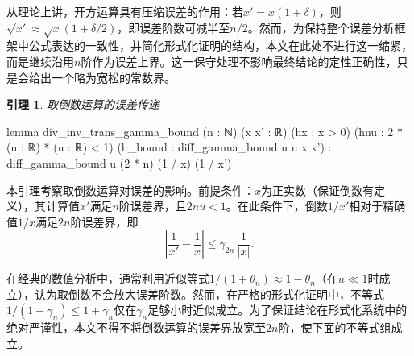 ﻿\documentclass[UTF8,a4paper,openany]{ctexbook}
\theoremstyle{qrplain}
\newtheorem{lemma}[definition]{引理}
{}
\begin{document}
从理论上讲，开方运算具有压缩误差的作用：若$x'=x(1+\delta)$，则$\sqrt{x'} \approx \sqrt{x}(1+\delta/2)$，即误差阶数可减半至$n/2$。然而，为保持整个误差分析框架中公式表达的一致性，并简化形式化证明的结构，本文在此处不进行这一缩紧，而是继续沿用$n$阶作为误差上界。这一保守处理不影响最终结论的定性正确性，只是会给出一个略为宽松的常数界。

\begin{lemma}
\label{lem:inv-bound}
  取倒数运算的误差传递
\end{lemma}
\begin{leancode}
  lemma div_inv_trans_gamma_bound (n : ℕ) (x x' : ℝ) (hx : x > 0)
    (hnu : 2 * (n : ℝ) * (u : ℝ) < 1)
    (h_bound : diff_gamma_bound u n x x') :
      diff_gamma_bound u (2 * n) (1 / x) (1 / x') 
\end{leancode}

本引理考察取倒数运算对误差的影响。前提条件：$x$为正实数（保证倒数有定义），其计算值$x'$满足$n$阶误差界，且$2nu<1$。在此条件下，倒数$1/x'$相对于精确值$1/x$满足$2n$阶误差界，即
$$
\left|\frac{1}{x'} - \frac{1}{x}\right| \le \gamma_{2n}\,\frac{1}{|x|}.
$$

在经典的数值分析中，通常利用近似等式$1/(1+\theta_n)\approx 1-\theta_n$（在$u\ll 1$时成立），认为取倒数不会放大误差阶数。然而，在严格的形式化证明中，不等式$1/(1-\gamma_n)\le 1+\gamma_n$仅在$\gamma_n$足够小时近似成立。为了保证结论在形式化系统中的绝对严谨性，本文不得不将倒数运算的误差界放宽至$2n$阶，使下面的不等式组成立。
\end{document}

